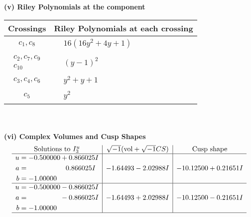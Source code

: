 \documentclass[1p]{elsarticle_modified}
\theoremstyle{definition}
\newcommand{\I}{\sqrt{-1}}
\begin{document}
\flushleft \textbf{(v) Riley Polynomials at the component}\newline \\
\begin{tabular}{m{50pt}|m{274pt}}
Crossings & \hspace{64pt}Riley Polynomials at each crossing \\
\hline $$\begin{aligned}c_{1},c_{8}\end{aligned}$$&$\begin{aligned}
&16(16 y^2+4 y+1)
\end{aligned}$\\
\hline $$\begin{aligned}c_{2},c_{7},c_{9}\\c_{10}\end{aligned}$$&$\begin{aligned}
&(y-1)^2
\end{aligned}$\\
\hline $$\begin{aligned}c_{3},c_{4},c_{6}\end{aligned}$$&$\begin{aligned}
&y^2+y+1
\end{aligned}$\\
\hline $$\begin{aligned}c_{5}\end{aligned}$$&$\begin{aligned}
&y^2
\end{aligned}$\\
\hline
\end{tabular}\\~\\
\newpage\flushleft \textbf{(vi) Complex Volumes and Cusp Shapes}
$$\begin{array}{c|c|c}  
\text{Solutions to }I^u_{3}& \I (\text{vol} + \sqrt{-1}CS) & \text{Cusp shape}\\
 \hline 
\begin{aligned}
u &= -0.500000 + 0.866025 I \\
a &= \phantom{-0.000000 -}0.866025 I \\
b &= -1.00000\phantom{ +0.000000I}\end{aligned}
 & -1.64493 - 2.02988 I & -10.12500 + 0.21651 I \\ \hline\begin{aligned}
u &= -0.500000 - 0.866025 I \\
a &= \phantom{-0.000000 } -0.866025 I \\
b &= -1.00000\phantom{ +0.000000I}\end{aligned}
 & -1.64493 + 2.02988 I & -10.12500 - 0.21651 I\\
 \hline 
 \end{array}$$\newpage
\end{document}
